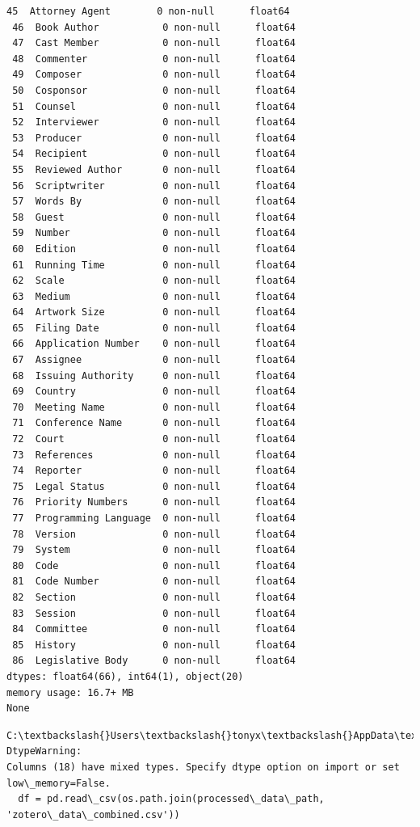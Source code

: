 \documentclass[11pt]{article}
\begin{document}
\begin{Verbatim}[commandchars=\\\{\}]
 45  Attorney Agent        0 non-null      float64
 46  Book Author           0 non-null      float64
 47  Cast Member           0 non-null      float64
 48  Commenter             0 non-null      float64
 49  Composer              0 non-null      float64
 50  Cosponsor             0 non-null      float64
 51  Counsel               0 non-null      float64
 52  Interviewer           0 non-null      float64
 53  Producer              0 non-null      float64
 54  Recipient             0 non-null      float64
 55  Reviewed Author       0 non-null      float64
 56  Scriptwriter          0 non-null      float64
 57  Words By              0 non-null      float64
 58  Guest                 0 non-null      float64
 59  Number                0 non-null      float64
 60  Edition               0 non-null      float64
 61  Running Time          0 non-null      float64
 62  Scale                 0 non-null      float64
 63  Medium                0 non-null      float64
 64  Artwork Size          0 non-null      float64
 65  Filing Date           0 non-null      float64
 66  Application Number    0 non-null      float64
 67  Assignee              0 non-null      float64
 68  Issuing Authority     0 non-null      float64
 69  Country               0 non-null      float64
 70  Meeting Name          0 non-null      float64
 71  Conference Name       0 non-null      float64
 72  Court                 0 non-null      float64
 73  References            0 non-null      float64
 74  Reporter              0 non-null      float64
 75  Legal Status          0 non-null      float64
 76  Priority Numbers      0 non-null      float64
 77  Programming Language  0 non-null      float64
 78  Version               0 non-null      float64
 79  System                0 non-null      float64
 80  Code                  0 non-null      float64
 81  Code Number           0 non-null      float64
 82  Section               0 non-null      float64
 83  Session               0 non-null      float64
 84  Committee             0 non-null      float64
 85  History               0 non-null      float64
 86  Legislative Body      0 non-null      float64
dtypes: float64(66), int64(1), object(20)
memory usage: 16.7+ MB
None
    \end{Verbatim}

    \begin{Verbatim}[commandchars=\\\{\}]
C:\textbackslash{}Users\textbackslash{}tonyx\textbackslash{}AppData\textbackslash{}Local\textbackslash{}Temp\textbackslash{}ipykernel\_89676\textbackslash{}2082748027.py:4: DtypeWarning:
Columns (18) have mixed types. Specify dtype option on import or set
low\_memory=False.
  df = pd.read\_csv(os.path.join(processed\_data\_path,
'zotero\_data\_combined.csv'))
    \end{Verbatim}
\end{document}
